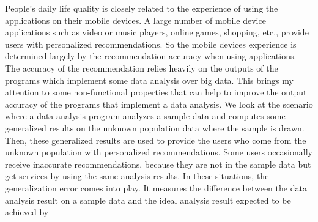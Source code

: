 People's daily life
quality is closely related to the experience of using the applications on their mobile devices.
A large number of mobile device applications
such as video or music players, online games, shopping, etc.,
provide users with personalized recommendations.
So the mobile devices experience
is determined largely by
the recommendation accuracy when using applications.
The accuracy of the recommendation
relies heavily on the
outputs of the programs which implement some
data analysis over big data.
This brings my attention to
some non-functional properties
that can help to improve the output accuracy of
the programs that implement a data analysis.
We look at the scenario
% 
where a data analysis program
analyzes a sample data
and computes some generalized results
on the unknown population data
where the sample is drawn.
Then, these generalized results are used to provide the
users who come from the unknown population with personalized recommendations.
Some users occasionally receive inaccurate recommendations,
because they are not in the sample data but get services by using the
same
analysis results.
In these situations, the generalization error comes into play. 
It measures the difference between the 
data analysis result on a sample data 
and the ideal analysis result expected to be
achieved by
